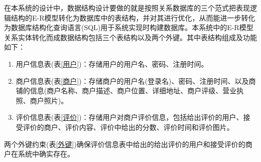 \documentclass[]{article}
\begin{document}
	在本系统的设计中，数据结构设计要做的就是按照关系数据库的三个范式把表现逻辑结构的E-R模型转化为数据库中的表结构，并对其进行优化，从而能进一步转化为数据库结构化查询语言(SQL)用于系统实现时构建数据库。本系统中的E-R模型关系实体转化而成数据结构包括三个表结构以及两个外键。其中表结构组成及功能如下：
	
	\begin{enumerate}
		\item 用户信息表(表\ref{用户})：存储用户的用户名、密码、注册时间。
		\item 商户信息表(表\ref{商户})：存储商户的用户名(登录名)、密码、注册时间、以及商铺的信息(商户名称、商户描述、商户位置、详细地址、商户评级、营业执照、商户照片)。
		\item 评价信息表(表\ref{评价})：存储用户对商户评价信息，包括给出评价的用户、接受评价的商户、评价内容、评价中给出的分数、评价时间和评价图片。
	\end{enumerate}
	
	两个外键约束(表\ref{外键})确保评价信息表中给出的给出评价的用户和接受评价的商户在系统中确实存在。
\end{document}
